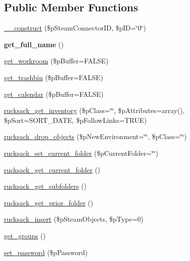 \subsection*{Public Member Functions}
\begin{DoxyCompactItemize}
\item 
\hyperlink{classsteam__user_afef25cd8d74dde70ca3066c6057d7d49}{\_\-\_\-construct} (\$pSteamConnectorID, \$pID=\char`\"{}0\char`\"{})
\item 
\hypertarget{classsteam__user_a56a740f35d798c241965eba013a9045c}{
{\bfseries get\_\-full\_\-name} ()}
\label{classsteam__user_a56a740f35d798c241965eba013a9045c}

\item 
\hyperlink{classsteam__user_a98ab47d36263d3279402dea2e7169e36}{get\_\-workroom} (\$pBuffer=FALSE)
\item 
\hyperlink{classsteam__user_ab99aa45b194a7fa364c94caade7c738a}{get\_\-trashbin} (\$pBuffer=FALSE)
\item 
\hyperlink{classsteam__user_ab4f588497517cb3ab51ab9b800c225e6}{get\_\-calendar} (\$pBuffer=FALSE)
\item 
\hyperlink{classsteam__user_aa66454321688bb2e2d6126eafba0abdc}{rucksack\_\-get\_\-inventory} (\$pClass=\char`\"{}\char`\"{}, \$pAttributes=array(), \$pSort=SORT\_\-DATE, \$pFollowLinks=TRUE)
\item 
\hyperlink{classsteam__user_a4913e6b383a518edaca21e6860410d00}{rucksack\_\-drop\_\-objects} (\$pNewEnvironment=\char`\"{}\char`\"{}, \$pClass=\char`\"{}\char`\"{})
\item 
\hyperlink{classsteam__user_a25886c7480c1b53ad2504ce992ce369f}{rucksack\_\-set\_\-current\_\-folder} (\$pCurrentFolder=\char`\"{}\char`\"{})
\item 
\hyperlink{classsteam__user_a8b6575ad2bcda4a66a0b3c205ba9a18d}{rucksack\_\-get\_\-current\_\-folder} ()
\item 
\hyperlink{classsteam__user_adae347703d1fac19779556afdff73bb0}{rucksack\_\-get\_\-subfolders} ()
\item 
\hyperlink{classsteam__user_a0fb4f1ab88aec639e7cba5a52535e62d}{rucksack\_\-get\_\-prior\_\-folder} ()
\item 
\hyperlink{classsteam__user_a6caeeedf42d695aa9090c4eb49996f3e}{rucksack\_\-insert} (\$pSteamObjects, \$pType=0)
\item 
\hyperlink{classsteam__user_a85f83a84162e121a4ff6d9707b1bb304}{get\_\-groups} ()
\item 
\hyperlink{classsteam__user_ad77a04b8654e79fb831cc441bae72879}{set\_\-password} (\$pPassword)

\end{DoxyCompactItemize}
